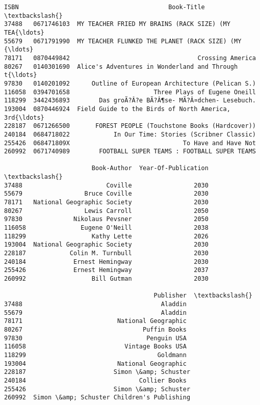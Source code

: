 \documentclass[11pt]{article}
\makeatletter
\newcommand{\boxspacing}{\kern\kvtcb@left@rule\kern\kvtcb@boxsep}
\newcommand{\prompt}[4]{
        {\ttfamily\llap{{\color{#2}[#3]:\hspace{3pt}#4}}\vspace{-\baselineskip}}
    }
\makeatother
\begin{document}
            \begin{tcolorbox}[breakable, size=fbox, boxrule=.5pt, pad at break*=1mm, opacityfill=0]
\prompt{Out}{outcolor}{17}{\boxspacing}
\begin{Verbatim}[commandchars=\\\{\}]
              ISBN                                         Book-Title  \textbackslash{}
37488   0671746103  MY TEACHER FRIED MY BRAINS (RACK SIZE) (MY TEA{\ldots}
55679   0671791990  MY TEACHER FLUNKED THE PLANET (RACK SIZE) (MY {\ldots}
78171   0870449842                                   Crossing America
80267   0140301690  Alice's Adventures in Wonderland and Through t{\ldots}
97830   0140201092      Outline of European Architecture (Pelican S.)
116058  0394701658                       Three Plays of Eugene Oneill
118299  3442436893        Das groÃ?Â?e BÃ?Â¶se- MÃ?Â¤dchen- Lesebuch.
193004  0870446924  Field Guide to the Birds of North America, 3rd{\ldots}
228187  0671266500       FOREST PEOPLE (Touchstone Books (Hardcover))
240184  0684718022            In Our Time: Stories (Scribner Classic)
255426  068471809X                               To Have and Have Not
260992  0671740989        FOOTBALL SUPER TEAMS : FOOTBALL SUPER TEAMS

                        Book-Author  Year-Of-Publication  \textbackslash{}
37488                       Coville                 2030
55679                 Bruce Coville                 2030
78171   National Geographic Society                 2030
80267                 Lewis Carroll                 2050
97830              Nikolaus Pevsner                 2050
116058               Eugene O'Neill                 2038
118299                  Kathy Lette                 2026
193004  National Geographic Society                 2030
228187            Colin M. Turnbull                 2030
240184             Ernest Hemingway                 2030
255426             Ernest Hemingway                 2037
260992                  Bill Gutman                 2030

                                         Publisher  \textbackslash{}
37488                                      Aladdin
55679                                      Aladdin
78171                          National Geographic
80267                                 Puffin Books
97830                                  Penguin USA
116058                           Vintage Books USA
118299                                    Goldmann
193004                         National Geographic
228187                        Simon \&amp; Schuster
240184                               Collier Books
255426                        Simon \&amp; Schuster
260992  Simon \&amp; Schuster Children's Publishing


\end{Verbatim}
\end{tcolorbox}
\end{document}
